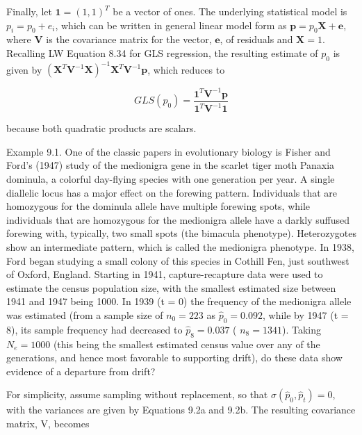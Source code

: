 \documentclass{article}
\begin{document}
Finally, let  $ \mathbf{1} = (1, 1)^T $ be a vector of ones. The underlying statistical model is  $ p_i = p_0 + e_i $, which can be written in general linear model form as  $ \mathbf{p} = p_0 \mathbf{X} + \mathbf{e} $, where  $ \mathbf{V} $ is the covariance matrix for the vector,  $ \mathbf{e} $, of residuals and  $ \mathbf{X} = 1 $. Recalling LW Equation 8.34 for GLS regression, the resulting estimate of  $ p_0 $ is given by  $ \left( \mathbf{X}^T \mathbf{V}^{-1} \mathbf{X} \right)^{-1} \mathbf{X}^T \mathbf{V}^{-1} \mathbf{p} $, which reduces to

\begin{equation}
GLS\left(p_{0}\right)=\frac{\mathbf{1}^{T}\mathbf{V}^{-1}\mathbf{p}}{\mathbf{1}^{T}\mathbf{V}^{-1}\mathbf{1}}
\tag{9.4}
\label{eq:9_4}
\end{equation}

because both quadratic products are scalars.

Example 9.1. One of the classic papers in evolutionary biology is Fisher and Ford's (1947) study of the medionigra gene in the scarlet tiger moth Panaxia dominula, a colorful day-flying species with one generation per year. A single diallelic locus has a major effect on the forewing pattern. Individuals that are homozygous for the dominula allele have multiple forewing spots, while individuals that are homozygous for the medionigra allele have a darkly suffused forewing with, typically, two small spots (the bimacula phenotype). Heterozygotes show an intermediate pattern, which is called the medionigra phenotype. In 1938, Ford began studying a small colony of this species in Cothill Fen, just southwest of Oxford, England. Starting in 1941, capture-recapture data were used to estimate the census population size, with the smallest estimated size between 1941 and 1947 being 1000. In 1939 (t = 0) the frequency of the medionigra allele was estimated (from a sample size of  $ n_0 = 223 $ as  $ \widehat{p}_0 = 0.092 $, while by 1947 (t = 8), its sample frequency had decreased to  $ \widehat{p}_8 = 0.037 $ ( $ n_8 = 1341 $). Taking  $ N_e = 1000 $ (this being the smallest estimated census value over any of the generations, and hence most favorable to supporting drift), do these data show evidence of a departure from drift?

For simplicity, assume sampling without replacement, so that  $ \sigma\left(\widehat{p}_{0},\widehat{p}_{t}\right)=0 $, with the variances are given by Equations 9.2a and 9.2b. The resulting covariance matrix, V, becomes
\end{document}
